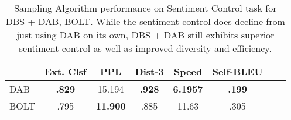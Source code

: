 \begin{table}[h]
\caption{Sampling Algorithm performance on Sentiment Control task for DBS + DAB, BOLT. While the sentiment control does decline from just using DAB on its own, DBS + DAB still exhibits superior sentiment control as well as improved diversity and efficiency.}
\label{appndx:tab:sentiment-control-div}
\centering

\begin{tabular}{lccccccl}\toprule
      & \textbf{Ext. Clsf} & \textbf{PPL} &\textbf{ Dist-3} & \textbf{Speed} &\textbf{Self-BLEU}\\\midrule
DAB & \textbf{.829} & 15.194 & \textbf{.928} & \textbf{6.1957} & \textbf{.199} \\
BOLT & .795 & \textbf{11.900} & .885 & 11.63 & .305
\\\bottomrule
\end{tabular}
\end{table}